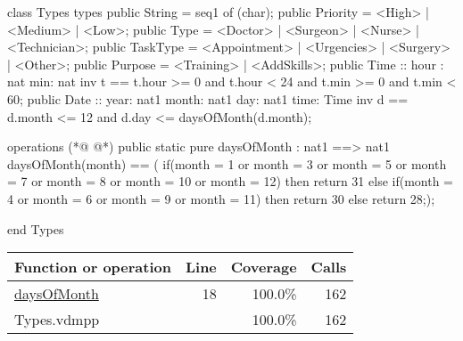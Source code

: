 \begin{vdmpp}[breaklines=true]
class Types
types
 public String = seq1 of (char);
 public Priority = <High> | <Medium> | <Low>;
 public Type = <Doctor> | <Surgeon> | <Nurse> | <Technician>;
 public TaskType = <Appointment> | <Urgencies> | <Surgery> | <Other>;
 public Purpose = <Training> | <AddSkills>;
 public Time :: hour : nat
         min: nat
 inv t == t.hour >= 0 and t.hour < 24 and t.min >= 0 and t.min < 60;
 public Date ::  year: nat1
         month: nat1
         day: nat1
         time: Time
 inv d == d.month <= 12 and d.day <= daysOfMonth(d.month);
 
operations
(*@
\label{daysOfMonth:18}
@*)
 public static pure daysOfMonth : nat1 ==> nat1
  daysOfMonth(month) == (
              if(month = 1 or month = 3 or month = 5 or month = 7 or month = 8 or month = 10 or month = 12)
               then return 31
              else if(month = 4 or month = 6 or month = 9 or month = 11)
               then return 30
              else
               return 28;);
                
end Types
\end{vdmpp}
\bigskip
\begin{longtable}{|l|r|r|r|}
\hline
Function or operation & Line & Coverage & Calls \\
\hline
\hline
\hyperref[daysOfMonth:18]{daysOfMonth} & 18&100.0\% & 162 \\
\hline
\hline
Types.vdmpp & & 100.0\% & 162 \\
\hline
\end{longtable}

